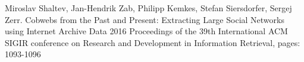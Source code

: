 

\begin{cvhonors}


  \cvhonor
    {Miroslav Shaltev, Jan-Hendrik Zab, Philipp Kemkes, Stefan Siersdorfer, Sergej Zerr.} %
    {Cobwebs from the Past and Present: Extracting Large Social Networks using Internet Archive Data} %
    {2016} %
    {Proceedings of the 39th International ACM SIGIR conference on Research and Development in Information Retrieval, pages: 1093-1096}

\end{cvhonors}
